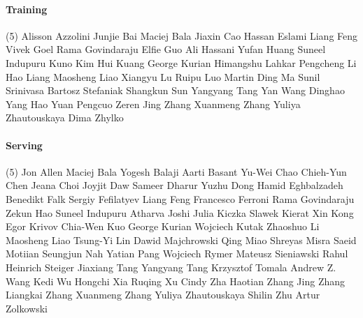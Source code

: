 \vspace{-0.32\baselineskip}\paragraph{\footnotesize Training} \mbox{}
\vspace{-0.32\baselineskip}
\begingroup
\footnotesize
\begin{tasks}[label=\relax, label-width=0pt, item-indent=4pt](5)
\task Alisson Azzolini
\task Junjie Bai
\task Maciej Bala
\task Jiaxin Cao
\task Hassan Eslami
\task Liang Feng
\task Vivek Goel
\task Rama Govindaraju
\task Elfie Guo
\task Ali Hassani
\task Yufan Huang
\task Suneel Indupuru
\task Kuno Kim
\task Hui Kuang
\task George Kurian
\task Himangshu Lahkar
\task Pengcheng Li
\task Hao Liang
\task Maosheng Liao
\task Xiangyu Lu
\task Ruipu Luo
\task Martin Ding Ma
\task Sunil Srinivasa
\task Bartosz Stefaniak
\task Shangkun Sun
\task Yangyang Tang
\task Yan Wang
\task Dinghao Yang
\task Hao Yuan
\task Pengcuo Zeren
\task Jing Zhang
\task Xuanmeng Zhang
\task Yuliya Zhautouskaya
\task Dima Zhylko
\end{tasks}
\endgroup

\vspace{-0.32\baselineskip}\paragraph{\footnotesize Serving} \mbox{}
\vspace{-0.32\baselineskip}
\begingroup
\footnotesize
\begin{tasks}[label=\relax, label-width=0pt, item-indent=4pt](5)
\task Jon Allen
\task Maciej Bala
\task Yogesh Balaji
\task Aarti Basant
\task Yu-Wei Chao
\task Chieh-Yun Chen
\task Jeana Choi
\task Joyjit Daw
\task Sameer Dharur
\task Yuzhu Dong
\task Hamid Eghbalzadeh
\task Benedikt Falk
\task Sergiy Fefilatyev
\task Liang Feng
\task Francesco Ferroni
\task Rama Govindaraju
\task Zekun Hao
\task Suneel Indupuru
\task Atharva Joshi
\task Julia Kiczka
\task Slawek Kierat
\task Xin Kong
\task Egor Krivov
\task Chia-Wen Kuo
\task George Kurian
\task Wojciech Kutak
\task Zhaoshuo Li
\task Maosheng Liao
\task Tsung-Yi Lin
\task Dawid Majchrowski
\task Qing Miao
\task Shreyas Misra
\task Saeid Motiian
\task Seungjun Nah
\task Yatian Pang
\task Wojciech Rymer
\task Mateusz Sieniawski
\task Rahul Heinrich Steiger
\task Jiaxiang Tang
\task Yangyang Tang
\task Krzysztof Tomala
\task Andrew Z. Wang
\task Kedi Wu
\task Hongchi Xia
\task Ruqing Xu
\task Cindy Zha
\task Haotian Zhang
\task Jing Zhang
\task Liangkai Zhang
\task Xuanmeng Zhang
\task Yuliya Zhautouskaya
\task Shilin Zhu
\task Artur Zolkowski
\end{tasks}
\endgroup

